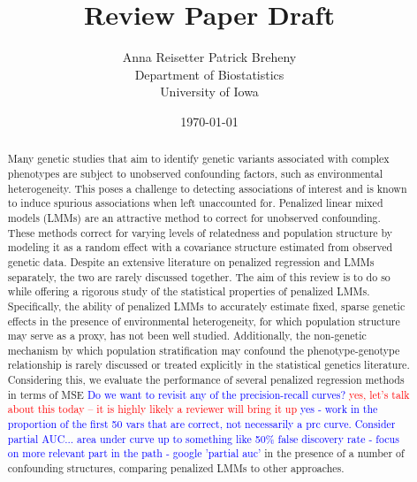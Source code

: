 \documentclass[a4paper]{article}
\title{Review Paper Draft}
\author{Anna Reisetter \qquad Patrick Breheny\\
  Department of Biostatistics\\University of Iowa}
\date{\today}
\providecommand{\pb}[1]{\textcolor{red}{#1}}
\providecommand{\anna}[1]{\textcolor{blue}{#1}}
\begin{document}
\maketitle

\begin{abstract}
Many genetic studies that aim to identify genetic variants associated with complex phenotypes are subject to unobserved confounding factors, such as environmental heterogeneity. This poses a challenge to detecting associations of interest and is known to induce spurious associations when left unaccounted for. Penalized linear mixed models (LMMs) are an attractive method to correct for unobserved confounding. These methods correct for varying levels of relatedness and population structure by modeling it as a random effect with a covariance structure estimated from observed genetic data. Despite an extensive literature on penalized regression and LMMs separately, the two are rarely discussed together. The aim of this review is to do so while offering a rigorous study of the statistical properties of penalized LMMs. Specifically, the ability of penalized LMMs to accurately estimate fixed, sparse genetic effects in the presence of environmental heterogeneity, for which population structure may serve as a proxy, has not been well studied. Additionally, the non-genetic mechanism by which population stratification may confound the phenotype-genotype relationship is rarely discussed or treated explicitly in the statistical genetics literature. Considering this, we evaluate the performance of several penalized regression methods in terms of MSE \anna{Do we want to revisit any of the precision-recall curves?} \pb {yes, let's talk about this today -- it is highly likely a reviewer will bring it up} \anna{yes - work in the proportion of the first 50 vars that are correct, not necessarily a prc curve. Consider partial AUC... area under curve up to something like 50\% false discovery rate - focus on more relevant part in the path - google 'partial auc'} in the presence of a number of confounding structures, comparing penalized LMMs to other approaches.
\end{abstract}



\newpage



\end{document}
